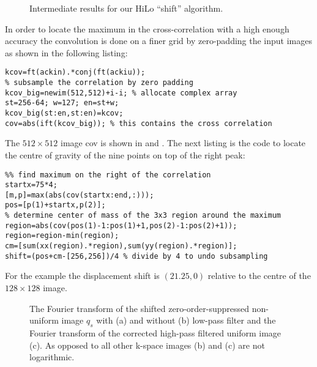 \begin{figure}[htb]
  \centering {}
  \caption{Intermediate results for our HiLo ``shift'' algorithm.}
  \label{fig:hilo3}
\end{figure}
In order to locate the maximum in the cross-correlation with a high
enough accuracy the convolution is done on a finer grid by
zero-padding the input images as shown in the following listing: 
\begin{lstlisting}
kcov=ft(ackin).*conj(ft(ackiu));
% subsample the correlation by zero padding
kcov_big=newim(512,512)+i-i; % allocate complex array
st=256-64; w=127; en=st+w;
kcov_big(st:en,st:en)=kcov;
cov=abs(ift(kcov_big)); % this contains the cross correlation
\end{lstlisting}
The $512\times512$ image {\sf cov} is shown in  and
. The next listing is the code to locate the centre
of gravity of the nine points on top of the right peak:
\begin{lstlisting}
%% find maximum on the right of the correlation
startx=75*4;
[m,p]=max(abs(cov(startx:end,:)));
pos=[p(1)+startx,p(2)];
% determine center of mass of the 3x3 region around the maximum
region=abs(cov(pos(1)-1:pos(1)+1,pos(2)-1:pos(2)+1));
region=region-min(region);
cm=[sum(xx(region).*region),sum(yy(region).*region)];
shift=(pos+cm-[256,256])/4 % divide by 4 to undo subsampling
\end{lstlisting}
For the example the displacement {\sf shift} is $(21.25,0)$ relative
to the centre of the $128\times128$ image.
\begin{figure}[htb]
  \centering {}
  \caption{The Fourier transform of the shifted zero-order-suppressed
    non-uniform image $q_s$ with (a) and without (b) low-pass filter
    and the Fourier transform of the corrected high-pass filtered
    uniform image (c). As opposed to all other k-space images (b) and
    (c) are not logarithmic.}
  \label{fig:hilo3_2}
\end{figure}
